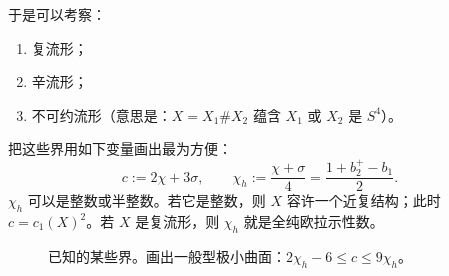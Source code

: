 于是可以考察：
\begin{enumerate}[label=\arabic*., leftmargin=2.1em]
\item 复流形；
\item 辛流形；
\item 不可约流形（意思是：$X=X_{1}\#X_{2}$ 蕴含 $X_{1}$ 或 $X_{2}$ 是 $S^{4}$）。
\end{enumerate}

把这些界用如下变量画出最为方便：
\begin{equation}
  c:=2\chi+3\sigma,\qquad
  \chi_{h}:=\frac{\chi+\sigma}{4}=\frac{1+b_{2}^{+}-b_{1}}{2}.
  \tag{11.2}
\end{equation}
$\chi_{h}$ 可以是整数或半整数。若它是整数，则 $X$ 容许一个近复结构；此时 $c=c_{1}(X)^{2}$。若 $X$ 是复流形，则 $\chi_{h}$ 就是全纯欧拉示性数。



\begin{figure}[H]
  \centering
  \caption{已知的某些界。画出一般型极小曲面：$2\chi_{h}-6\le c\le 9\chi_{h}$。}
  \label{fig:known-bounds}
\end{figure}

